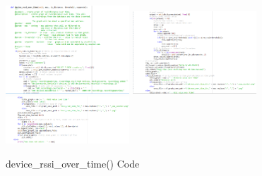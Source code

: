 \documentclass{report}
\begin{document}
\begin{figure}[h!]
    \centering
    \includegraphics[width=175]{distance_rssi_over_time_1.PNG}
    \includegraphics[width=175]{distance_rssi_over_time_2.PNG}
    \includegraphics[width=175]{distance_rssi_over_time_3.PNG}
    \caption{device\_rssi\_over\_time() Code}
    \label{fig:rssiToDistance}
\end{figure} \\
\end{document}
